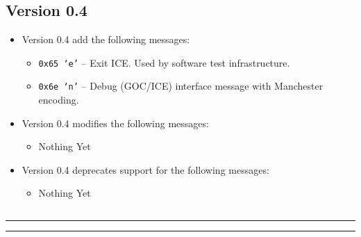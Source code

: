 \subsection{Version 0.4}
\label{protocol-0-4}

\begin{itemize}

\item Version 0.4 add the following messages:
\begin{itemize}
  \item \texttt{0x65 `e'} -- Exit ICE. Used by software test infrastructure.
  \item \texttt{0x6e `n'} -- Debug (GOC/ICE) interface message with Manchester encoding.
\end{itemize}

\item Version 0.4 modifies the following messages:
\begin{itemize}
  \item Nothing Yet
\end{itemize}

\item Version 0.4 deprecates support for the following messages:
\begin{itemize}
  \item Nothing Yet
\end{itemize}

\end{itemize}

\setcounter{tocdepth}{4}
\etocsettocstyle
    {\subsection*{\contentsname}\hrule\medskip
        }
    {\nobreak\medskip\hrule\bigskip}

\localtableofcontents

